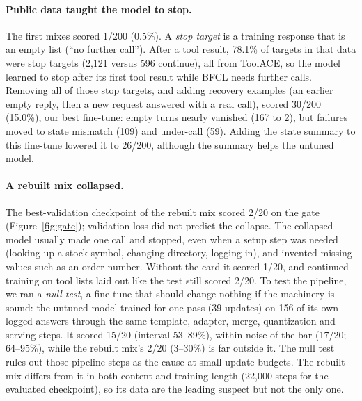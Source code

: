 \documentclass[11pt]{article}
\begin{document}
\paragraph{Public data taught the model to stop.} The first mixes scored 1/200 (0.5\%). A \emph{stop target} is a training response that is an empty list (``no further call''). After a tool result, 78.1\% of targets in that data were stop targets (2{,}121 versus 596 continue), all from ToolACE, so the model learned to stop after its first tool result while BFCL needs further calls. Removing all of those stop targets, and adding recovery examples (an earlier empty reply, then a new request answered with a real call), scored 30/200 (15.0\%), our best fine-tune: empty turns nearly vanished (167 to 2), but failures moved to state mismatch (109) and under-call (59). Adding the state summary to this fine-tune lowered it to 26/200, although the summary helps the untuned model.

\paragraph{A rebuilt mix collapsed.} The best-validation checkpoint of the rebuilt mix scored 2/20 on the gate (Figure~\ref{fig:gate}); validation loss did not predict the collapse. The collapsed model usually made one call and stopped, even when a setup step was needed (looking up a stock symbol, changing directory, logging in), and invented missing values such as an order number. Without the card it scored 1/20, and continued training on tool lists laid out like the test still scored 2/20. To test the pipeline, we ran a \emph{null test}, a fine-tune that should change nothing if the machinery is sound: the untuned model trained for one pass (39 updates) on 156 of its own logged answers through the same template, adapter, merge, quantization and serving steps. It scored 15/20 (interval 53--89\%), within noise of the bar (17/20; 64--95\%), while the rebuilt mix's 2/20 (3--30\%) is far outside it. The null test rules out those pipeline steps as the cause at small update budgets. The rebuilt mix differs from it in both content and training length (22{,}000 steps for the evaluated checkpoint), so its data are the leading suspect but not the only one.
\end{document}
